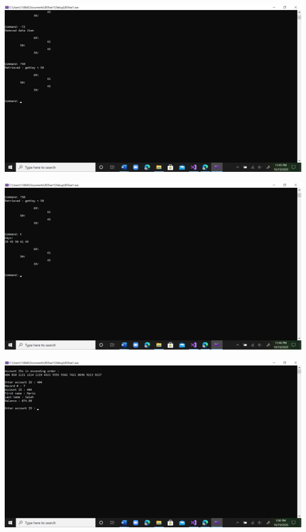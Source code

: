 \begin{DoxyImageNoCaption}
  \mbox{\includegraphics[width=17cm]{Lab9Test1.4.png}}
\end{DoxyImageNoCaption}



\begin{DoxyImageNoCaption}
  \mbox{\includegraphics[width=17cm]{Lab9Test1.5.png}}
\end{DoxyImageNoCaption}



\begin{DoxyImageNoCaption}
  \mbox{\includegraphics[width=17cm]{Lab9Test2.png}}
\end{DoxyImageNoCaption}



